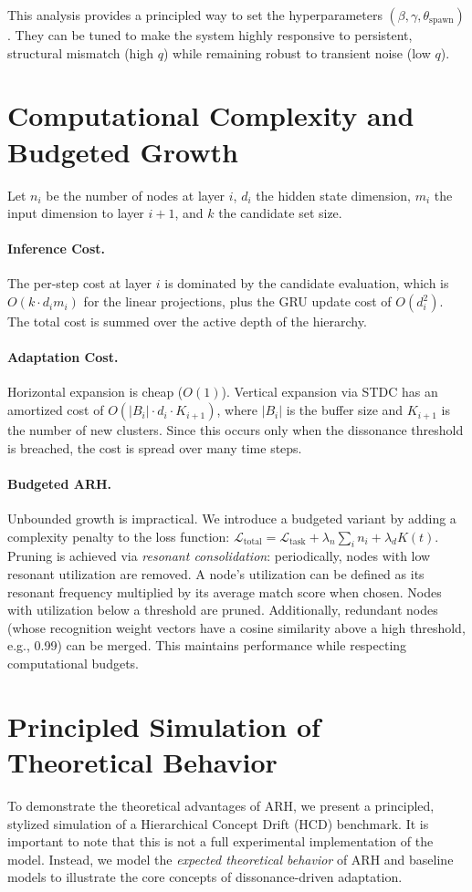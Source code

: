 \documentclass{article}
\begin{document}
This analysis provides a principled way to set the hyperparameters $(\beta, \gamma, \theta_{\text{spawn}})$. They can be tuned to make the system highly responsive to persistent, structural mismatch (high $q$) while remaining robust to transient noise (low $q$).

\section{Computational Complexity and Budgeted Growth}
Let $n_i$ be the number of nodes at layer $i$, $d_i$ the hidden state dimension, $m_i$ the input dimension to layer $i+1$, and $k$ the candidate set size.
\paragraph{Inference Cost.} The per-step cost at layer $i$ is dominated by the candidate evaluation, which is $O(k \cdot d_i m_i)$ for the linear projections, plus the GRU update cost of $O(d_i^2)$. The total cost is summed over the active depth of the hierarchy.
\paragraph{Adaptation Cost.} Horizontal expansion is cheap ($O(1)$). Vertical expansion via STDC has an amortized cost of $O(|B_i| \cdot d_i \cdot K_{i+1})$, where $|B_i|$ is the buffer size and $K_{i+1}$ is the number of new clusters. Since this occurs only when the dissonance threshold is breached, the cost is spread over many time steps.

\paragraph{Budgeted ARH.} Unbounded growth is impractical. We introduce a budgeted variant by adding a complexity penalty to the loss function: $\mathcal{L}_{\text{total}} = \mathcal{L}_{\text{task}} + \lambda_n \sum_i n_i + \lambda_d K(t)$. Pruning is achieved via \emph{resonant consolidation}: periodically, nodes with low resonant utilization are removed. A node's utilization can be defined as its resonant frequency multiplied by its average match score when chosen. Nodes with utilization below a threshold are pruned. Additionally, redundant nodes (whose recognition weight vectors have a cosine similarity above a high threshold, e.g., 0.99) can be merged. This maintains performance while respecting computational budgets.

\section{Principled Simulation of Theoretical Behavior}
To demonstrate the theoretical advantages of ARH, we present a principled, stylized simulation of a Hierarchical Concept Drift (HCD) benchmark. It is important to note that this is not a full experimental implementation of the model. Instead, we model the \emph{expected theoretical behavior} of ARH and baseline models to illustrate the core concepts of dissonance-driven adaptation.
\end{document}
